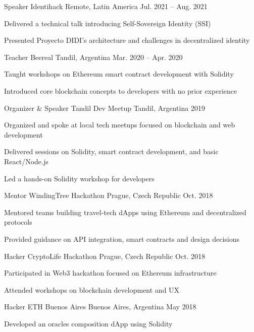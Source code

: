 
\begin{cventries}

\cventry
{Speaker} %
{Identihack} %
{Remote, Latin America} %
{Jul. 2021 – Aug. 2021}
{
\begin{cvitems}
\item {Delivered a technical talk introducing Self-Sovereign Identity (SSI)}
\item {Presented Proyecto DIDI's architecture and challenges in decentralized identity}
\end{cvitems}
}

\cventry
{Teacher} %
{Beereal} %
{Tandil, Argentina} %
{Mar. 2020 – Apr. 2020}
{
\begin{cvitems}
\item {Taught workshops on Ethereum smart contract development with Solidity}
\item {Introduced core blockchain concepts to developers with no prior experience}
\end{cvitems}
}

\cventry
{Organizer \& Speaker} %
{Tandil Dev Meetup} %
{Tandil, Argentina} %
{2019}
{
\begin{cvitems}
\item {Organized and spoke at local tech meetups focused on blockchain and web development}
\item {Delivered sessions on Solidity, smart contract development, and basic React/Node.js}
\item {Led a hands-on Solidity workshop for developers}
\end{cvitems}
}

\cventry
{Mentor} %
{WindingTree Hackathon} %
{Prague, Czech Republic} %
{Oct. 2018}
{
\begin{cvitems}
\item {Mentored teams building travel-tech dApps using Ethereum and decentralized protocols}
\item {Provided guidance on API integration, smart contracts and design decisions}
\end{cvitems}
}

\cventry
{Hacker} %
{CryptoLife Hackathon} %
{Prague, Czech Republic} %
{Oct. 2018}
{
\begin{cvitems}
\item {Participated in Web3 hackathon focused on Ethereum infrastructure}
\item {Attended workshops on blockchain development and UX}
\end{cvitems}
}

\cventry
{Hacker} %
{ETH Buenos Aires} %
{Buenos Aires, Argentina} %
{May 2018}
{
\begin{cvitems}
\item {Developed an oracles composition dApp using Solidity}
\end{cvitems}
}

\end{cventries}
